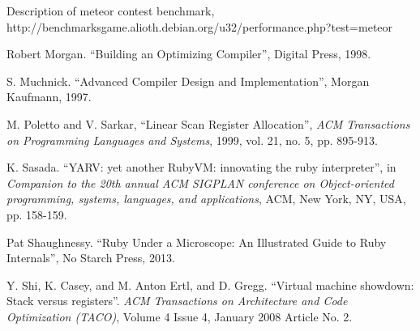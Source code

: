 \documentclass[preprint]{sigplanconf}
\begin{document}
\begin{thebibliography}{}
  Description of meteor contest benchmark,
  http://benchmarksgame.alioth.debian.org/u32/performance.php?test=meteor
  
 Robert Morgan.  ``Building an Optimizing
  Compiler'',  Digital Press, 1998.

 S. Muchnick. ``Advanced Compiler Design and
  Implementation'',  Morgan Kaufmann, 1997.

M. Poletto and V. Sarkar, ``Linear Scan Register Allocation'',
\emph{ACM Transactions on Programming Languages and Systems}, 1999,
vol. 21, no. 5, pp. 895-913.
      
K. Sasada. ``YARV: yet another RubyVM: innovating the ruby
interpreter'', in \emph{Companion to the 20th annual ACM SIGPLAN
conference on Object-oriented programming, systems, languages, and
applications}, ACM, New York, NY, USA, pp. 158-159.

Pat Shaughnessy. ``Ruby Under a Microscope: An Illustrated Guide to
Ruby Internals'', No Starch Press, 2013.
  
Y. Shi, K. Casey, and M. Anton Ertl, and D. Gregg. ``Virtual machine
showdown: Stack versus registers''. \emph{ACM Transactions on Architecture
 and Code Optimization (TACO)}, Volume 4 Issue 4, January 2008
Article No. 2.

\end{thebibliography}
\end{document}
